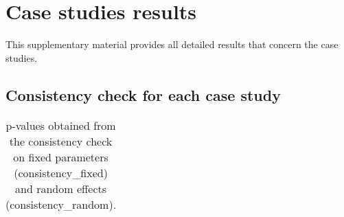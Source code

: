 \clearpage

\section{Case studies results}\label{appendix:CaseStudy}

This supplementary material provides all detailed results that concern the case studies.

\subsection{Consistency check for each case study}\label{appendix:ConsistencyCase}

\begin{center}
\begin{longtable}{llllll}
\caption{p-values obtained from the consistency check on fixed parameters (consistency_fixed) and random effects (consistency_random).}\label{tab:Consistency} \\


\end{longtable}
\end{center}
